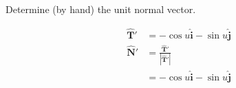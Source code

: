 Determine (by hand) the unit normal vector.

\begin{solution}
\begin{align*}
    \boldsymbol{\hat{T}'} &= -\cos u \hat{\boldsymbol{i}} - \sin u \hat{\boldsymbol{j}} \\
    \boldsymbol{\hat{N}'} &= \frac{\boldsymbol{\hat{T}'}}{|\boldsymbol{\hat{T}'}|} \\
    &= -\cos u \hat{\boldsymbol{i}} - \sin u \hat{\boldsymbol{j}} \\
\end{align*}
\end{solution}